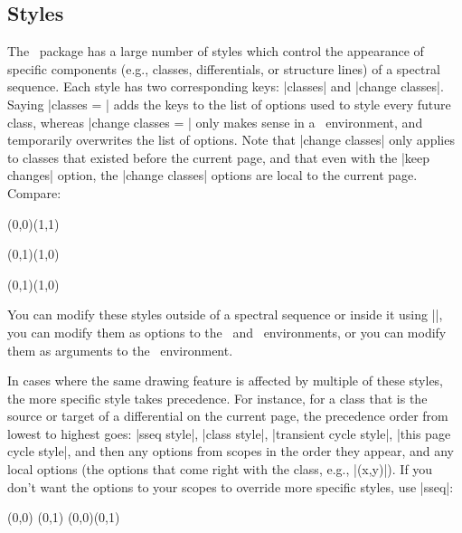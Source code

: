 \begin{sseqdata}[name = basic, cohomological Serre grading]
\section{Styles}%
The \sseqpages\  package has a large number of styles which control the
appearance of specific components (e.g., classes, differentials, or structure
lines) of a spectral sequence. Each style has two corresponding keys: |classes|
and |change classes|.  Saying |classes = | adds the keys to the list
of options used to style every future class, whereas%
|change classes = | only makes sense in a \sseqpageenv\  environment,
and temporarily overwrites the list of options. Note that |change classes| only
applies to classes that existed before the current page, and that even with the
|keep changes| option, the |change classes| options are local to the current
page. Compare:
\begin{codeexample}[width = 8cm]
\begin{sseqdata}[ name = style example ]
\class(0,0)\class(1,1)
\end{sseqdata}
\begin{sseqpage}[ name = style example,
                  classes = { fill, blue },
                  title = change new classes ]
\class(0,1)\class(1,0)
\end{sseqpage}
\quad
\begin{sseqpage}[ name = style example,
                  change classes = { fill, blue },
                  title = change old classes ]
\class(0,1)\class(1,0)
\end{sseqpage}
\end{codeexample}

You can modify these styles outside of a spectral sequence or inside it using
|\sseqset|, you can modify them as options to the \sseqdataenv\  and
\sseqpageenv\  environments, or you can modify them as arguments to the
\scopeenv\  environment.

In cases where the same drawing feature is affected by multiple of these styles,
the more specific style takes precedence. For instance, for a class that is the
source or target of a differential on the current page, the precedence order
from lowest to highest goes: |sseq style|, |class style|,%
|transient cycle style|, |this page cycle style|, and then any options from
scopes in the order they appear, and any local options (the options that come
right with the class, e.g., |(x,y)|). If you don't want the
options to your scopes to override more specific styles, use |sseq|:
\begin{codeexample}[width = 7cm]
\begin{sseqpage}[ classes = { blue, fill },
   title style = { align = center, text width = 2.4cm },
   title = { everything is orange } ]
\begin{scope}[orange]
\class(0,0) \class(0,1)
\structline(0,0)(0,1)
\end{scope}
\end{sseqpage}


\end{codeexample}
\end{sseqdata}
